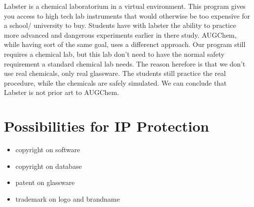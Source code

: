\documentclass[%
    paper=A4,               %
    twoside=true,           %
    openany,              %
    parskip=full,           %
    chapterprefix=true,     %
    11pt,                   %
    headings=normal,        %
    bibliography=totoc,     %
    listof=totoc,           %
    titlepage=on,           %
    captions=tableabove,    %
    draft=false,            %
]{scrreprt}
\numberwithin{equation}{section}
\begin{document}
        Labster is a chemical laboratorium in a virtual environment. This program gives you access to high tech lab instruments that would otherwise be too expensive for a school/ university to buy.
        Students have with labster the ability to practice more advanced and dangerous experiments earlier in there study. AUGChem, while having sort of the same goal, uses a differenct approach. Our program 
        still requires a chemical lab, but this lab don't need to have the normal safety requirement a standard chemical lab needs. The reason herefore is that we don't use real chemicals, only real glassware. 
        The students still practice the real procedure, while the chemicals are safely simulated. We can conclude that Labster is not prior art to AUGChem.
    

    

    \section{Possibilities for IP Protection}
    \label{sec:protection}
    \begin{itemize}
        \item copyright on software
        \item copyright on database
        \item patent on glassware
        \item trademark on logo and brandname
    \end{itemize}
\end{document}
